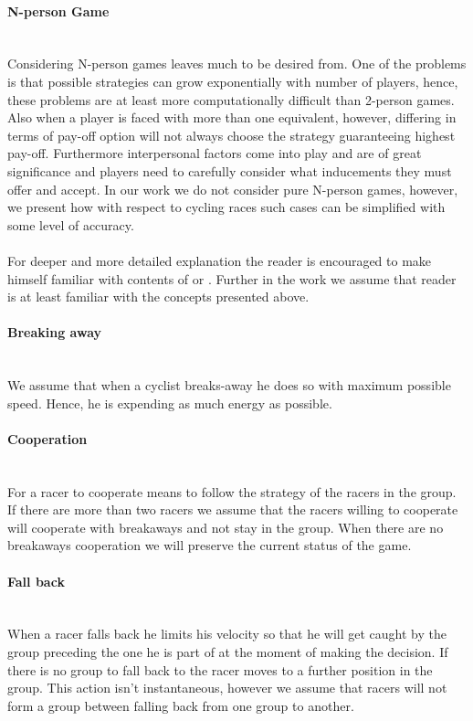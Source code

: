 \documentclass[10pt, a4paper]{report}
\begin{document}
\paragraph{N-person Game} ~\\
Considering N-person games leaves much to be desired from. One of the problems is that possible strategies can grow exponentially with number of players, hence, these problems are at least more computationally difficult than 2-person games. Also when a player is faced with more than one equivalent, however, differing in terms of pay-off option will not always choose the strategy guaranteeing highest pay-off. Furthermore interpersonal factors come into play and are of great significance and players need to carefully consider what inducements they must offer and accept. In our work we do not consider pure N-person games, however, we present how with respect to cycling races such cases can be simplified with some level of accuracy.
\\\\
For deeper and more detailed explanation the reader is encouraged to make himself familiar with contents of \cite{GameTheoryNonTechnical} or \cite{GameTheoryApplications}. Further in the work we assume that reader is at least familiar with the concepts presented above.

\paragraph{Breaking away} ~\\
We assume that when a cyclist breaks-away he does so with maximum possible speed. Hence, he is expending as much energy as possible.

\paragraph{Cooperation} ~\\
For a racer to cooperate means to follow the strategy of the racers in the group. If there are more than two racers we assume that the racers willing to cooperate will cooperate with breakaways and not stay in the group. When there are no breakaways cooperation we will preserve the current status of the game.

\paragraph{Fall back} ~\\
When a racer falls back he limits his velocity so that he will get caught by the group preceding the one he is part of at the moment of making the decision. If there is no group to fall back to the racer moves to a further position in the group. This action isn't instantaneous, however we assume that racers will not form a group between falling back from one group to another.
\end{document}
